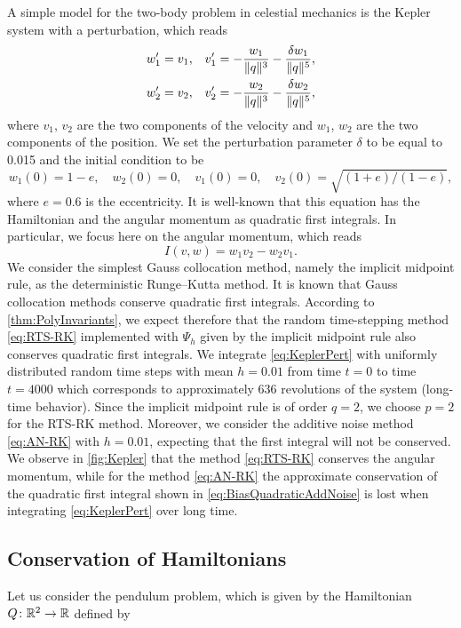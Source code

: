 \documentclass[10pt]{article}
\begin{document}
A simple model for the two-body problem in celestial mechanics is the Kepler system with a perturbation, which reads
\begin{equation}\label{eq:KeplerPert}
\begin{aligned}
	w_1' &= v_1, && v_1' = -\frac{w_1}{\lVert q\rVert^3} - \frac{\delta w_1}{\lVert q\rVert^5}, \\
	w_2' &= v_2, && v_2' = -\frac{w_2}{\lVert q\rVert^3} - \frac{\delta w_2}{\lVert q\rVert^5},
\end{aligned}
\end{equation}
where $v_1$, $v_2$ are the two components of the velocity and $w_1$, $w_2$ are the two components of the position. We set the perturbation parameter $\delta$ to be equal to 0.015 and the initial condition to be
\begin{equation}
	w_1(0) = 1 - e,\quad w_2(0) = 0, \quad v_1(0) = 0, \quad v_2(0) = \sqrt{(1 + e)/(1 − e)},
\end{equation}
where $e = 0.6$ is the eccentricity. It is well-known that this equation has the Hamiltonian and the angular momentum as quadratic first integrals. In particular, we focus here on the angular momentum, which reads
\begin{equation}\label{eq:AngularMomentum}
	I(v, w) = w_1v_2 - w_2v_1.
\end{equation}
We consider the simplest Gauss collocation method, namely the implicit midpoint rule, as the deterministic Runge--Kutta method. It is known that Gauss collocation methods conserve quadratic first integrals. According to \cref{thm:PolyInvariants}, we expect therefore that the random time-stepping method \eqref{eq:RTS-RK} implemented with $\Psi_h$ given by the implicit midpoint rule also conserves quadratic first integrals. We {integrate} \eqref{eq:KeplerPert} with uniformly distributed random time steps with mean $h = 0.01$ from time $t = 0$ to time $t = 4000$ which corresponds to approximately $636$ revolutions of the system (long-time behavior). Since the implicit midpoint rule is of order $q = 2$, we choose $p = 2$ for the RTS-RK method. Moreover, we consider the additive noise method \eqref{eq:AN-RK} with $h = 0.01$, expecting that the first integral will not be conserved. We observe in \cref{fig:Kepler} that the method \eqref{eq:RTS-RK} conserves the angular momentum, while for the method \eqref{eq:AN-RK} the approximate conservation of the quadratic first integral shown in \eqref{eq:BiasQuadraticAddNoise} is lost when integrating \eqref{eq:KeplerPert} over long time.

\subsection{Conservation of Hamiltonians} Let us consider the pendulum problem, which is given by the Hamiltonian $Q \colon \mathbb{R}^2 \to \mathbb{R}$ defined by
\end{document}
